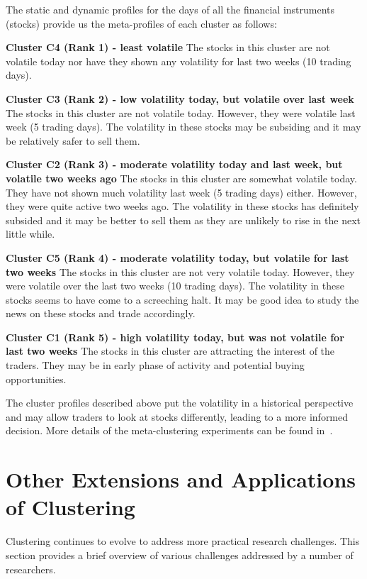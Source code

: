 \documentclass[oribibl]{llncs}
\begin{document}
The static and dynamic profiles for the days of all the financial instruments (stocks)
provide us the meta-profiles of each cluster as follows:

\noindent
{\bf Cluster C4 (Rank 1) - least volatile}
The stocks in this cluster are not volatile today nor have they shown any volatility for last two weeks (10 trading days).

\noindent
{\bf Cluster C3 (Rank 2) - low volatility today, but volatile over last week}
The stocks in this cluster are not volatile today. However, they were volatile last week (5 trading days). The volatility in these stocks may be subsiding and it may be relatively safer to sell them.

\noindent
{\bf Cluster C2 (Rank 3) - moderate volatility today and last week, but volatile two weeks ago}
The stocks in this cluster are somewhat volatile today. They have not shown much volatility last week (5 trading days) either. However, they were quite active two weeks ago. The volatility in these stocks has definitely subsided and it may be better to sell them as they are unlikely to rise in the next little while.

\noindent
{\bf Cluster C5 (Rank 4) - moderate volatility today, but volatile for last two weeks}
The stocks in this cluster are not very volatile today. However, they were volatile over the last two weeks (10 trading days). The volatility in these stocks seems to have come to a screeching halt. It may be good idea to study the news on these stocks and trade accordingly.

\noindent
{\bf Cluster C1 (Rank 5) - high volatility today, but was not volatile for last two weeks}
The stocks in this cluster are attracting the interest of the traders. They may be in early phase of activity and potential buying opportunities.

The cluster profiles described above put the volatility in a historical perspective and may allow traders to look at stocks differently, leading to a more informed decision.
More details of the meta-clustering experiments can be found in~\cite{LingrasHaiderTriff2016}.

\section{Other Extensions and Applications of Clustering}
Clustering continues to evolve to address more practical research challenges. This section provides a brief overview of various challenges addressed by a number of researchers.
\end{document}
